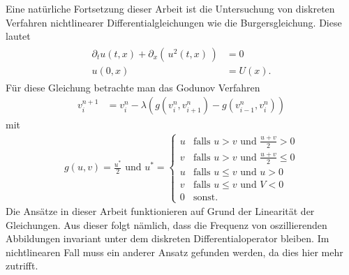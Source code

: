 Eine natürliche Fortsetzung dieser Arbeit ist die Untersuchung von diskreten Verfahren nichtlinearer  Differentialgleichungen wie die Burgersgleichung.
Diese lautet
\begin{align}
\begin{split}
\partial_t u(t,x) + \partial_x \left( \, u^2(t,x) \,\right) &= 0\\
u(0,x) &= U(x).
\end{split}
\end{align}
Für diese Gleichung betrachte man das Godunov Verfahren
\begin{align}
v^{n+1}_i &= v^n_i - \lambda \left( g(v^n_i, v^n_{i+1}) - g(v^n_{i-1}, v^n_i) \right)
\end{align}
mit
\begin{align}
g(u,v) = \frac{u^*}2 \text{ und } u^* =
\begin{cases}
u & \text{falls $u > v$ und $\frac {u+v}2 > 0$}\\
v & \text{falls $u > v$ und $\frac {u+v}2 \leq 0$}\\
u & \text{falls $u \leq v$ und $u > 0$}\\
v & \text{falls $u \leq v$ und $V < 0$}\\
0 & \text{sonst.}
\end{cases}
\end{align}
Die Ansätze in dieser Arbeit funktionieren auf Grund der Linearität der Gleichungen.
Aus dieser folgt nämlich, dass die Frequenz von oszillierenden Abbildungen invariant unter dem diskreten Differentialoperator bleiben. 
Im nichtlinearen Fall muss ein anderer Ansatz gefunden werden, da dies hier mehr zutrifft.